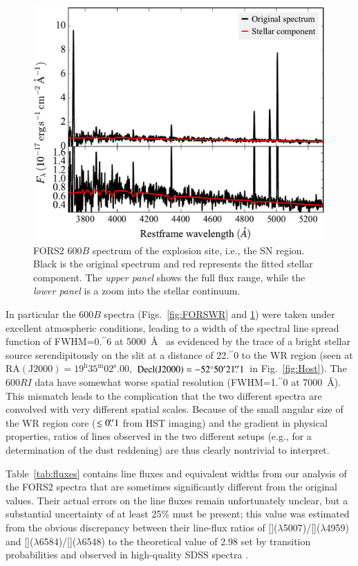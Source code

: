 \documentclass[traditabstract]{aa}
\newcommand{\farc}{\hbox{$.\!\!^{\prime\prime}$}}
\newcommand{\oiii}{[\ion{O}{iii}]}
\newcommand{\nii}{[\ion{N}{ii}]}
\begin{document}
\begin{appendix}
\begin{figure}
\includegraphics[angle=0, width=0.93\columnwidth]{Figs/FORS2_3700_5301_starlight.pdf}
\caption{FORS2 600$B$ spectrum of the explosion site, i.e., the SN region. {Black is the original spectrum and red represents the fitted stellar component. The \textit{upper panel} shows the full flux range, while the \textit{lower panel} is a zoom into the stellar continuum.}}
\label{fig:FORSSN}
\end{figure}

In particular the 600$B$ spectra (Figs.~\ref{fig:FORSWR} and \ref{fig:FORSSN}) were taken under excellent atmospheric conditions, leading to a width of the spectral line spread function of FWHM=0\farc{6} at 5000~\AA~ as evidenced by the trace of a bright stellar source serendipitously on the slit at a distance of 22\farc{0} to the WR region (seen at $\mathrm{RA(J2000)=19^{h}35^{m}02^{s}.00}$, $\mathrm{Decl(J2000)} = -52^{\circ}50'21\farc{1}$ in Fig.~\ref{fig:Host}). The 600$RI$ data have somewhat worse spatial resolution (FWHM=1\farc{0} at 7000~\AA). This mismatch leads to the complication that the two different spectra are convolved with very different spatial scales. Because of the small angular size of the WR region core ($\lesssim 0\farc{1}$ from HST imaging) and the gradient in physical properties, ratios of lines observed in the two different setups (e.g., for a determination of the dust reddening) are thus clearly nontrivial to interpret.

Table~\ref{tab:fluxes} contains line fluxes and equivalent widths from our analysis of the FORS2 spectra that are sometimes significantly different from the original \citet{2006A&A...454..103H} values. Their actual errors on the line fluxes remain unfortunately unclear, but a substantial uncertainty of at least 25\% must be present; this value was estimated from the obvious discrepancy between their line-flux ratios of \oiii($\lambda$5007)/\oiii($\lambda$4959) and \nii($\lambda$6584)/\nii($\lambda$6548) to the theoretical value of 2.98 set by transition probabilities and observed in high-quality SDSS spectra \citep[e.g.,][]{2000MNRAS.312..813S, 2006agna.book.....O, 2016MNRAS.459.3475W}.


\end{appendix}
\end{document}
